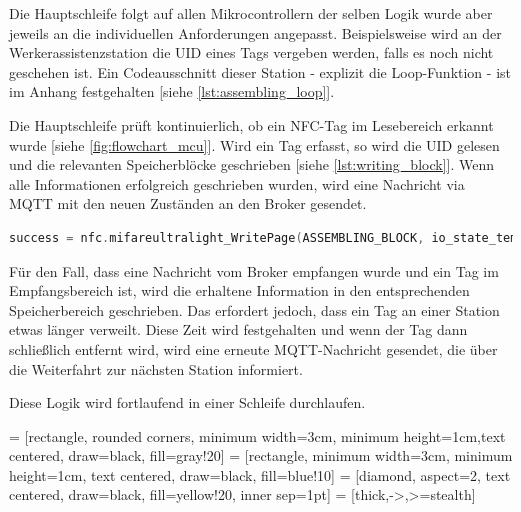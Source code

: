 Die Hauptschleife folgt auf allen Mikrocontrollern der selben Logik wurde aber jeweils an die individuellen Anforderungen angepasst. Beispielsweise wird an der Werkerassistenzstation die UID eines Tags vergeben werden, falls es noch nicht geschehen ist. Ein Codeausschnitt dieser Station - explizit die Loop-Funktion - ist im Anhang festgehalten [siehe \autoref{lst:assembling_loop}].

Die Hauptschleife prüft kontinuierlich, ob ein NFC-Tag im Lesebereich erkannt wurde [siehe \autoref{fig:flowchart_mcu}]. Wird ein Tag erfasst, so wird die UID gelesen und die relevanten Speicherblöcke geschrieben [siehe \autoref{lst:writing_block}]. Wenn alle Informationen erfolgreich geschrieben wurden, wird eine Nachricht via MQTT mit den neuen Zuständen an den Broker gesendet. 

\begin{lstlisting}[language=C, caption = Funktion zum Schreiben einer Information auf einen Speicherblock am Beispiel der Werkerassistenzstation, label=lst:writing_block]
	success = nfc.mifareultralight_WritePage(ASSEMBLING_BLOCK, io_state_temp);
\end{lstlisting}

Für den Fall, dass eine Nachricht vom Broker empfangen wurde und ein Tag im Empfangsbereich ist, wird die erhaltene Information in den entsprechenden Speicherbereich geschrieben. Das erfordert jedoch, dass ein Tag an einer Station etwas länger verweilt. Diese Zeit wird festgehalten und wenn der Tag dann schließlich entfernt wird, wird eine erneute MQTT-Nachricht gesendet, die über die Weiterfahrt zur nächsten Station informiert. 

Diese Logik wird fortlaufend in einer Schleife durchlaufen.

 = [rectangle, rounded corners, minimum width=3cm, minimum height=1cm,text centered, draw=black, fill=gray!20]
 = [rectangle, minimum width=3cm, minimum height=1cm, text centered, draw=black, fill=blue!10]
 = [diamond, aspect=2, text centered, draw=black, fill=yellow!20, inner sep=1pt]
 = [thick,->,>=stealth]



